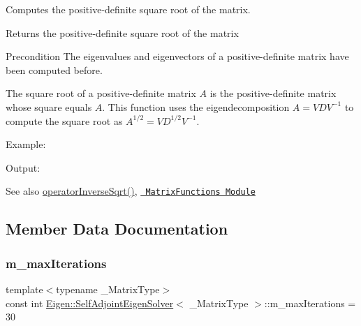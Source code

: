 Computes the positive-\/definite square root of the matrix. 

\begin{DoxyReturn}{Returns}
the positive-\/definite square root of the matrix
\end{DoxyReturn}
\begin{DoxyPrecond}{Precondition}
The eigenvalues and eigenvectors of a positive-\/definite matrix have been computed before.
\end{DoxyPrecond}
The square root of a positive-\/definite matrix $ A $ is the positive-\/definite matrix whose square equals $ A $. This function uses the eigendecomposition $ A = V D V^{-1} $ to compute the square root as $ A^{1/2} = V D^{1/2} V^{-1} $.

Example\+: 
\begin{DoxyCodeInclude}{0}
\end{DoxyCodeInclude}
 Output\+: 
\begin{DoxyVerbInclude}
\end{DoxyVerbInclude}


\begin{DoxySeeAlso}{See also}
\mbox{\hyperlink{class_eigen_1_1_self_adjoint_eigen_solver_a71fe0aea0b22d176efcea556c5c160f5}{operator\+Inverse\+Sqrt()}}, \href{unsupported/group__MatrixFunctions__Module.html}{\texttt{ Matrix\+Functions Module}} 
\end{DoxySeeAlso}


\subsection{Member Data Documentation}
\mbox{\label{class_eigen_1_1_self_adjoint_eigen_solver_a9ba10b83f095b18dbea345db7304acfa}} 
\subsubsection{\texorpdfstring{m\_maxIterations}{m\_maxIterations}}
{\footnotesize\ttfamily template$<$typename \+\_\+\+Matrix\+Type$>$ \\
const int \mbox{\hyperlink{class_eigen_1_1_self_adjoint_eigen_solver}{Eigen\+::\+Self\+Adjoint\+Eigen\+Solver}}$<$ \+\_\+\+Matrix\+Type $>$\+::m\+\_\+max\+Iterations = 30\hspace{0.3cm}{\ttfamily [static]}}



